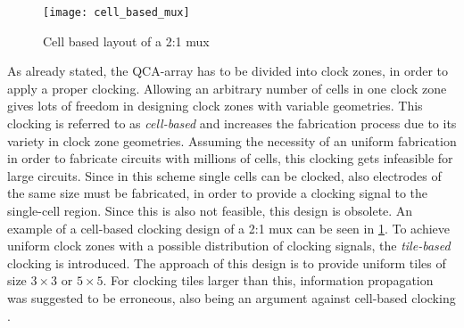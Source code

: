 \begin{figure}
	\centering
	\texttt{[image: cell\_based\_mux]}
	\caption{Cell based layout of a 2:1 mux \cite{majeed2019optimal}}\label{fig:cell_based_mux}
\end{figure}

As already stated, the QCA-array has to be divided into clock zones, in order to apply a proper clocking. Allowing an arbitrary number of cells in one clock zone gives lots of freedom in designing clock zones with variable geometries. This clocking is referred to as \textit{cell-based} and increases the fabrication process due to its variety in clock zone geometries. Assuming the necessity of an uniform fabrication in order to fabricate circuits with millions of cells, this clocking gets infeasible for large circuits. Since in this scheme single cells can be clocked, also electrodes of the same size must be fabricated, in order to provide a clocking signal to the single-cell region. Since this is also not feasible, this design is obsolete. An example of a cell-based clocking design of a 2:1 mux can be seen in \ref{fig:cell_based_mux}. To achieve uniform clock zones with a possible distribution of clocking signals, the \textit{tile-based} clocking is introduced. The approach of this design is to provide uniform tiles of size $3 \times 3$ or $5 \times 5$. For clocking tiles larger than this, information propagation was suggested to be erroneous, also being an argument against cell-based clocking \cite{taucer2015consequences}.


